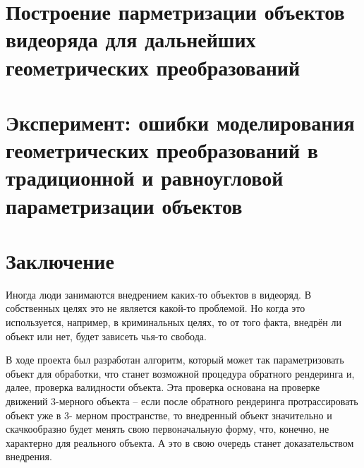 \documentclass[]{article}
\begin{document}
\newpage
\section{Построение парметризации объектов видеоряда для дальнейших геометрических преобразований}

\newpage
\section{Эксперимент: ошибки моделирования геометрических преобразований в традиционной и равноугловой параметризации объектов}

\newpage
\section*{Заключение}
Иногда люди занимаются внедрением каких-то объектов в видеоряд. В собственных целях это не является какой-то проблемой. Но когда это используется, например, в криминальных целях, то от того факта, внедрён ли объект или нет, будет зависеть чья-то свобода. 

В ходе проекта был разработан алгоритм, который может так параметризовать объект для обработки, что станет возможной процедура обратного рендеринга и, далее, проверка валидности объекта. Эта проверка основана на проверке движений 3-мерного объекта – если после обратного рендеринга протрассировать объект уже в 3- мерном пространстве, то внедренный объект значительно и скачкообразно будет менять свою первоначальную форму, что, конечно, не характерно для реального объекта. А это в свою очередь станет доказательством внедрения.
\end{document}
